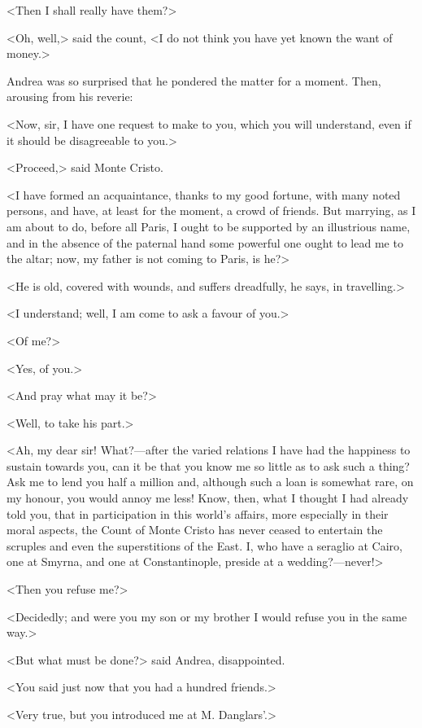  <Then I shall really have them?> 

 <Oh, well,> said the count, <I do not think you have yet known the want of money.> 

 Andrea was so surprised that he pondered the matter for a moment. Then, arousing from his reverie: 

 <Now, sir, I have one request to make to you, which you will understand, even if it should be disagreeable to you.> 

 <Proceed,> said Monte Cristo. 

 <I have formed an acquaintance, thanks to my good fortune, with many noted persons, and have, at least for the moment, a crowd of friends. But marrying, as I am about to do, before all Paris, I ought to be supported by an illustrious name, and in the absence of the paternal hand some powerful one ought to lead me to the altar; now, my father is not coming to Paris, is he?> 

 <He is old, covered with wounds, and suffers dreadfully, he says, in travelling.> 

 <I understand; well, I am come to ask a favour of you.> 

 <Of me?> 

 <Yes, of you.> 

 <And pray what may it be?> 

 <Well, to take his part.> 

 <Ah, my dear sir! What?—after the varied relations I have had the happiness to sustain towards you, can it be that you know me so little as to ask such a thing? Ask me to lend you half a million and, although such a loan is somewhat rare, on my honour, you would annoy me less! Know, then, what I thought I had already told you, that in participation in this world's affairs, more especially in their moral aspects, the Count of Monte Cristo has never ceased to entertain the scruples and even the superstitions of the East. I, who have a seraglio at Cairo, one at Smyrna, and one at Constantinople, preside at a wedding?—never!> 

 <Then you refuse me?> 

 <Decidedly; and were you my son or my brother I would refuse you in the same way.> 

 <But what must be done?> said Andrea, disappointed. 

 <You said just now that you had a hundred friends.> 

 <Very true, but you introduced me at M. Danglars'.> 

